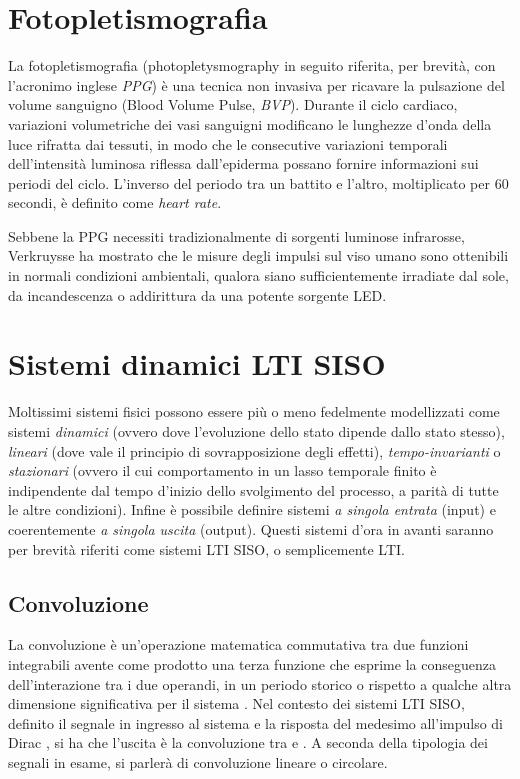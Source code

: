 \section{Fotopletismografia}	%
La fotopletismografia (photopletysmography in seguito riferita, per brevità, con l'acronimo inglese {\em PPG}) è una tecnica non invasiva per ricavare la pulsazione del volume sanguigno (Blood Volume Pulse, {\em BVP}). Durante il ciclo cardiaco, variazioni volumetriche dei vasi sanguigni modificano le lunghezze d'onda della luce rifratta dai tessuti, in modo che le consecutive variazioni temporali dell'intensità luminosa riflessa dall'epiderma possano fornire informazioni sui periodi del ciclo. L'inverso del periodo tra un battito e l'altro, moltiplicato per 60 secondi, è definito come {\em heart rate}.

Sebbene la PPG necessiti tradizionalmente di sorgenti luminose infrarosse, Verkruysse \cite{VER08} ha mostrato che le misure degli impulsi sul viso umano sono ottenibili in normali condizioni ambientali, qualora siano sufficientemente irradiate dal sole, da incandescenza o addirittura da una potente sorgente LED.
	\section{Sistemi dinamici LTI SISO} %
Moltissimi sistemi fisici possono essere più o meno fedelmente modellizzati come sistemi {\em dinamici} (ovvero dove l'evoluzione dello stato dipende dallo stato stesso), {\em lineari} (dove vale il principio di sovrapposizione degli effetti), {\em tempo-invarianti} o {\em stazionari} (ovvero il cui comportamento in un lasso temporale finito è indipendente dal tempo d'inizio dello svolgimento del processo, a parità di tutte le altre condizioni). Infine è possibile definire  sistemi {\em a singola entrata} (input) e coerentemente {\em a singola uscita} (output).
Questi sistemi d'ora in avanti saranno per brevità riferiti come sistemi LTI SISO, o semplicemente LTI.
	\subsection{Convoluzione}  %
La convoluzione è un'operazione matematica commutativa tra due funzioni integrabili avente come prodotto una terza funzione che esprime la conseguenza dell'interazione tra i due operandi, in un periodo storico o rispetto a qualche altra dimensione significativa per il sistema \cite{WIKI}. Nel contesto dei sistemi LTI SISO, definito  il segnale in ingresso al sistema e  la risposta del medesimo all'impulso di Dirac , si ha che l'uscita  è la convoluzione tra  e . A seconda della tipologia dei segnali in esame, si parlerà di convoluzione lineare o circolare.
